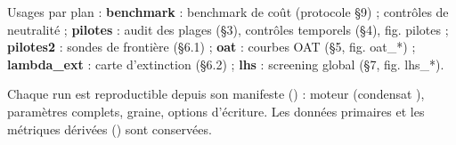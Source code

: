 \noindent Usages par plan : \textbf{benchmark} : benchmark de coût (protocole §9) ; contrôles de neutralité ; \textbf{pilotes} : audit des plages (§3), contrôles temporels (§4), fig. pilotes ; \textbf{pilotes2} : sondes de frontière (§6.1) ; \textbf{oat} : courbes OAT (§5, fig. oat\_*) ; \textbf{lambda\_ext} : carte d'extinction (§6.2) ; \textbf{lhs} : screening global (§7, fig. lhs\_*).

\noindent Chaque run est reproductible depuis son manifeste () : moteur  (condensat ), paramètres complets, graine, options d'écriture. Les données primaires et les métriques dérivées () sont conservées.